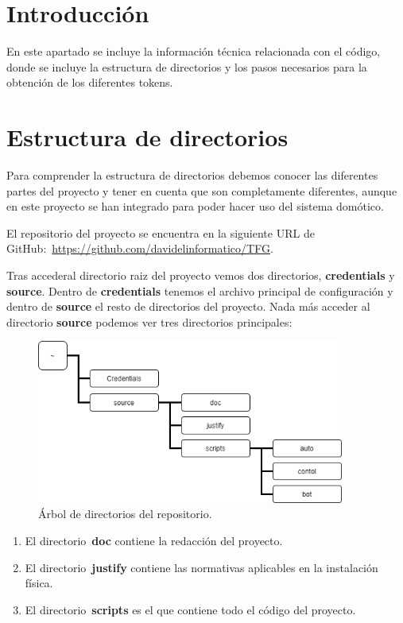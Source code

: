 
\section{Introducción}
En este apartado se incluye la información técnica relacionada con el código, donde se incluye la estructura de directorios y los pasos necesarios para la obtención de los diferentes tokens.

\section{Estructura de directorios}
Para comprender la estructura de directorios debemos conocer las diferentes partes del proyecto y tener en cuenta que son completamente diferentes, aunque en este proyecto se han integrado para poder hacer uso del sistema domótico. 

El repositorio del proyecto se encuentra en la siguiente URL de GitHub:~\url{https://github.com/davidelinformatico/TFG}.

Tras accederal directorio raiz del proyecto vemos dos directorios, \textbf{credentials} y \textbf{source}. Dentro de \textbf{credentials} tenemos el archivo principal de configuración y dentro de \textbf{source} el resto de directorios del proyecto. Nada más acceder al directorio \textbf{source} podemos ver tres directorios principales:

\begin{figure}[h]
\centering
\includegraphics[width=0.9\textwidth]{img/Diagramas/directorios1.png}
\caption{Árbol de directorios del repositorio.}\label{Directorios}
\end{figure}

\begin{enumerate}
    \item El directorio~\textbf{doc} contiene la redacción del proyecto.
    \item El directorio~\textbf{justify} contiene las normativas aplicables en la instalación física.
    \item El directorio~\textbf{scripts} es el que contiene todo el código del proyecto.
\end{enumerate}

